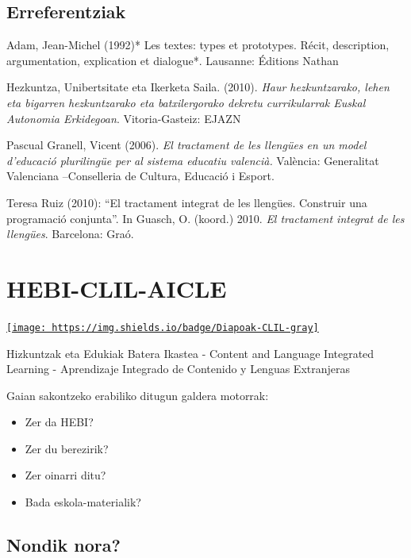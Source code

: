\documentclass[
]{book}
\providecommand{\tightlist}{%
  \setlength{\itemsep}{0pt}\setlength{\parskip}{0pt}}
\begin{document}
\hypertarget{erreferentziak}{%
\section{Erreferentziak}\label{erreferentziak}}

Adam, Jean-Michel (1992)* Les textes: types et prototypes. Récit, description, argumentation, explication et dialogue*. Lausanne: Éditions Nathan

Hezkuntza, Unibertsitate eta Ikerketa Saila. (2010). \emph{Haur hezkuntzarako, lehen eta bigarren hezkuntzarako eta batxilergorako dekretu currikularrak Euskal Autonomia Erkidegoan}. Vitoria-Gasteiz: EJAZN

Pascual Granell, Vicent (2006). \emph{El tractament de les llengües en un model d'educació plurilingüe per al sistema educatiu valencià.} València: Generalitat Valenciana --Conselleria de Cultura, Educació i Esport.

Teresa Ruiz (2010): ``El tractament integrat de les llengües. Construir una programació conjunta''. In Guasch, O. (koord.) 2010. \emph{El tractament integrat de les llengües}. Barcelona: Graó.

\hypertarget{hebi-clil-aicle}{%
\chapter{HEBI-CLIL-AICLE}\label{hebi-clil-aicle}}

\href{../diapoak/5-gaia-CLIL.pdf}{\texttt{[image: https://img.shields.io/badge/Diapoak-CLIL-gray]}}

Hizkuntzak eta Edukiak Batera Ikastea - Content and Language Integrated Learning - Aprendizaje Integrado de Contenido y Lenguas Extranjeras

Gaian sakontzeko erabiliko ditugun galdera motorrak:

\begin{itemize}
\tightlist
\item
  Zer da HEBI?
\item
  Zer du berezirik?
\item
  Zer oinarri ditu?
\item
  Bada eskola-materialik?
\end{itemize}

\hypertarget{nondik-nora}{%
\section{Nondik nora?}\label{nondik-nora}}
\end{document}
